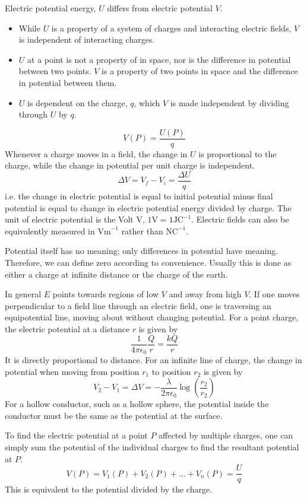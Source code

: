 \documentclass[12pt]{report}
\begin{document}
\begin{flushleft}
Electric potential energy, \(U\) differs from electric potential \(V\).
\begin{itemize}
    \item While \(U\) is a property of a system of charges and interacting 
        electric fields, \(V\) is independent of interacting charges.
    \item \(U\) at a point is not a property of in space, nor is the
        difference in potential between two points. \(V\) is a property of
        two points in space and the difference in potential between them.
    \item \(U\) is dependent on the charge, \(q\), which \(V\) is made 
        independent by dividing through \(U\) by \(q\).
\end{itemize}
\[V(P) = \frac{U(P)}{q}\]
Whenever a charge moves in a field, the change in \(U\) is proportional to
the charge, while the change in potential per unit charge is independent.
\[\Delta V = V_f - V_i = \frac{\Delta U}{q}\]
i.e. the change in electric potential is equal to initial potential minus final
potential is equal to change in electric potential energy divided by charge. 
The unit of electric potential is the Volt \(\mathrm{V}\), \(1\mathrm{V} = 
1 \mathrm{JC}^{-1}\). Electric fields can also be equivalently measured in 
\(\mathrm{Vm}^{-1}\) rather than \(\mathrm{NC}^{-1}\). \par
Potential itself has no meaning; only differences in potential have meaning.
Therefore, we can define zero according to convenience. Usually this is done
as either a charge at infinite distance or the charge of the earth. \par
In general \(E\) points towards regions of low \(V\) and away from high \(V\).
If one moves perpendicular to a field line through an electric field, one is
traversing an equipotential line, moving about without changing potential. For
a point charge, the electric potential at a distance \(r\) is given by
\[\frac{1}{4\pi\epsilon_0}\frac{Q}{r} = \frac{kQ}{r}\]
It is directly proportional to distance. For an infinite line of charge, the
change in potential when moving from position \(r_1\) to position \(r_2\) is
given by
\[V_2 - V_1 = \Delta V = -\frac{\lambda}{2\pi\epsilon_0}
\log\left(\frac{r_2}{r_2}\right)\]
For a hollow conductor, such as a hollow sphere, the potential inside the 
conductor must be the same as the potential at the surface. \par
To find the electric potential at a point \(P\) affected by multiple charges,
one can simply sum the potential of the individual charges to find the 
resultant potential at \(P\).
\[V(P) = V_1(P) + V_2(P) + \ldots + V_n(P) = \frac{U}{q}\]
This is equivalent to the potential divided by the charge.


\end{flushleft}
\end{document}
